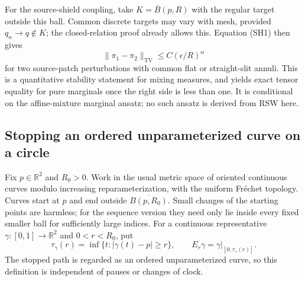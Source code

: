 \documentclass[11pt]{article}
\theoremstyle{definition}\newtheorem{definition}[theorem]{Definition}
\theoremstyle{remark}\newtheorem{remark}[theorem]{Remark}
\begin{document}
For the source-shield coupling, take $K=\overline B(p,R)$ with the
regular target outside this ball. Common discrete targets may vary with
mesh, provided $q_n\to q\notin K$; the closed-relation proof already allows
this. Equation (SH1) then gives
\[
 \|\pi_1-\pi_2\|_{\mathrm{TV}}
   \le C(\epsilon/R)^\alpha
 \tag{CB5}
\]
for two source-patch perturbations with common flat or straight-slit
annuli. This is a quantitative stability statement for mixing measures,
and yields exact tensor equality for pure marginals once the right side
is less than one. It is conditional on the affine-mixture marginal
ansatz; no such ansatz is derived from RSW here.


\subsection{Stopping an ordered unparameterized curve on a circle}

Fix $p\in\mathbb R^2$ and $R_0>0$. Work in the usual metric space of oriented
continuous curves modulo increasing reparameterization, with the uniform
Fr\'echet topology. Curves start at $p$ and end outside
$\overline{B(p,R_0)}$. Small changes of the starting points are harmless;
for the sequence version they need only lie inside every fixed smaller ball
for sufficiently large indices.
For a continuous representative $\gamma:[0,1]\to\mathbb R^2$ and
$0<r<R_0$, put
\[
 \tau_\gamma(r)=\inf\{t:|\gamma(t)-p|\geq r\},\qquad
 E_r\gamma=\gamma|_{[0,\tau_\gamma(r)]}.
 \tag{LT1}
\]
The stopped path is regarded as an ordered unparameterized curve, so this
definition is independent of pauses or changes of clock.
\end{document}
